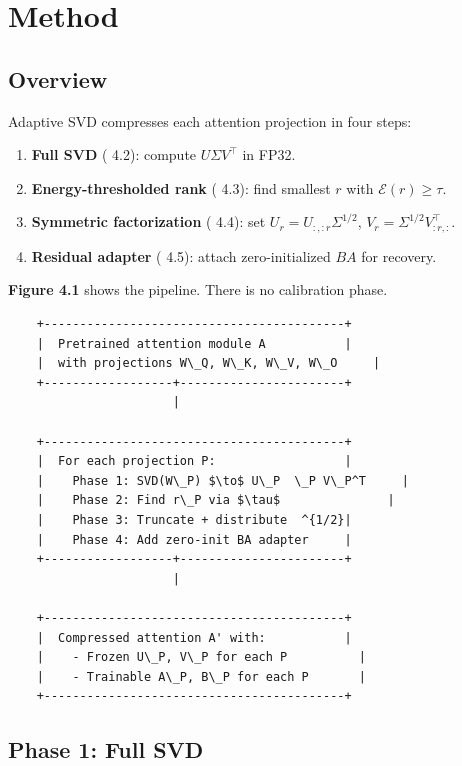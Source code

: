 
\section{Method}

\subsection{Overview}

Adaptive SVD compresses each attention projection in four steps:

\begin{enumerate}
\item \textbf{Full SVD} ( 4.2): compute $U \Sigma V^\top$ in FP32.
\item \textbf{Energy-thresholded rank} ( 4.3): find smallest $r$ with $\mathcal{E}(r) \geq \tau$.
\item \textbf{Symmetric factorization} ( 4.4): set $U_r = U_{:, :r} \Sigma^{1/2}$,
  $V_r = \Sigma^{1/2} V_{:r, :}^\top$.
\item \textbf{Residual adapter} ( 4.5): attach zero-initialized $B A$ for recovery.

\end{enumerate}
\textbf{Figure 4.1} shows the pipeline. There is no calibration phase.

\begin{lstlisting}
    +------------------------------------------+
    |  Pretrained attention module A           |
    |  with projections W\_Q, W\_K, W\_V, W\_O     |
    +------------------+-----------------------+
                       |
                        
    +------------------------------------------+
    |  For each projection P:                  |
    |    Phase 1: SVD(W\_P) $\to$ U\_P  \_P V\_P^T     |
    |    Phase 2: Find r\_P via $\tau$               |
    |    Phase 3: Truncate + distribute  ^{1/2}|
    |    Phase 4: Add zero-init BA adapter     |
    +------------------+-----------------------+
                       |
                        
    +------------------------------------------+
    |  Compressed attention A' with:           |
    |    - Frozen U\_P, V\_P for each P          |
    |    - Trainable A\_P, B\_P for each P       |
    +------------------------------------------+
\end{lstlisting}

\subsection{Phase 1: Full SVD}

